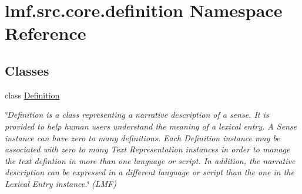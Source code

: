 \hypertarget{namespacelmf_1_1src_1_1core_1_1definition}{\section{lmf.\+src.\+core.\+definition Namespace Reference}
\label{namespacelmf_1_1src_1_1core_1_1definition}
}
\subsection*{Classes}
\begin{DoxyCompactItemize}
\item 
class \hyperlink{classlmf_1_1src_1_1core_1_1definition_1_1_definition}{Definition}
\begin{DoxyCompactList}\small\item\em \char`\"{}\+Definition is a class representing a narrative description of a sense. It is provided to help human users understand the meaning of a lexical entry. A Sense instance can have zero to many definitions. Each Definition instance may be associated with zero to many Text Representation instances in order to manage the text defintion in more than one language or script. In addition, the narrative description can be expressed in a different language or script than the one in the Lexical Entry instance.\char`\"{} (L\+M\+F) \end{DoxyCompactList}\end{DoxyCompactItemize}
